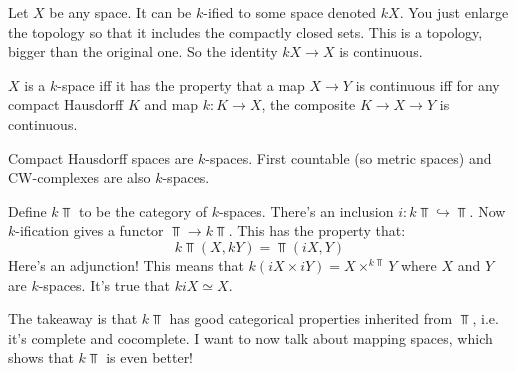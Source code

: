 Let $X$ be any space. It can be $k$-ified to some space denoted $kX$. You just enlarge the topology so that it includes the compactly closed sets. This is a topology, bigger than the original one. So the identity $kX\to X$ is continuous.

\begin{remark}
    $X$ is a $k$-space iff it has the property that a map $X\to Y$ is continuous iff for any compact Hausdorff $K$ and map $k:K\to X$, the composite $K\to X\to Y$ is continuous.
\end{remark}
\begin{example}
    Compact Hausdorff spaces are $k$-spaces. First countable (so metric spaces) and CW-complexes are also $k$-spaces.
\end{example}
Define $k\Top$ to be the category of $k$-spaces. There's an inclusion $i:k\Top\hookrightarrow \Top$. Now $k$-ification gives a functor $\Top\to k\Top$. This has the property that:
$$k\Top(X,kY)=\Top(iX,Y)$$
Here's an adjunction! This means that $k(iX\times iY)=X\times^{k\Top}Y$ where $X$ and $Y$ are $k$-spaces. It's true that $kiX\simeq X$.

The takeaway is that $k\Top$ has good categorical properties inherited from $\Top$, i.e. it's complete and cocomplete. I want to now talk about mapping spaces, which shows that $k\Top$ is even better!

